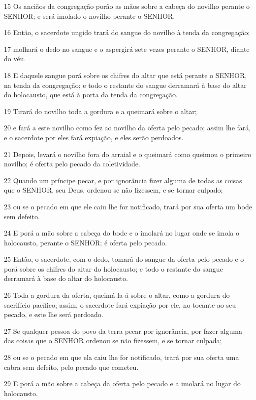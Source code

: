 \par 15 Os anciãos da congregação porão as mãos sobre a cabeça do novilho perante o SENHOR; e será imolado o novilho perante o SENHOR.
\par 16 Então, o sacerdote ungido trará do sangue do novilho à tenda da congregação;
\par 17 molhará o dedo no sangue e o aspergirá sete vezes perante o SENHOR, diante do véu.
\par 18 E daquele sangue porá sobre os chifres do altar que está perante o SENHOR, na tenda da congregação; e todo o restante do sangue derramará à base do altar do holocausto, que está à porta da tenda da congregação.
\par 19 Tirará do novilho toda a gordura e a queimará sobre o altar;
\par 20 e fará a este novilho como fez ao novilho da oferta pelo pecado; assim lhe fará, e o sacerdote por eles fará expiação, e eles serão perdoados.
\par 21 Depois, levará o novilho fora do arraial e o queimará como queimou o primeiro novilho; é oferta pelo pecado da coletividade.
\par 22 Quando um príncipe pecar, e por ignorância fizer alguma de todas as coisas que o SENHOR, seu Deus, ordenou se não fizessem, e se tornar culpado;
\par 23 ou se o pecado em que ele caiu lhe for notificado, trará por sua oferta um bode sem defeito.
\par 24 E porá a mão sobre a cabeça do bode e o imolará no lugar onde se imola o holocausto, perante o SENHOR; é oferta pelo pecado.
\par 25 Então, o sacerdote, com o dedo, tomará do sangue da oferta pelo pecado e o porá sobre os chifres do altar do holocausto; e todo o restante do sangue derramará à base do altar do holocausto.
\par 26 Toda a gordura da oferta, queimá-la-á sobre o altar, como a gordura do sacrifício pacífico; assim, o sacerdote fará expiação por ele, no tocante ao seu pecado, e este lhe será perdoado.
\par 27 Se qualquer pessoa do povo da terra pecar por ignorância, por fazer alguma das coisas que o SENHOR ordenou se não fizessem, e se tornar culpada;
\par 28 ou se o pecado em que ela caiu lhe for notificado, trará por sua oferta uma cabra sem defeito, pelo pecado que cometeu.
\par 29 E porá a mão sobre a cabeça da oferta pelo pecado e a imolará no lugar do holocausto.

